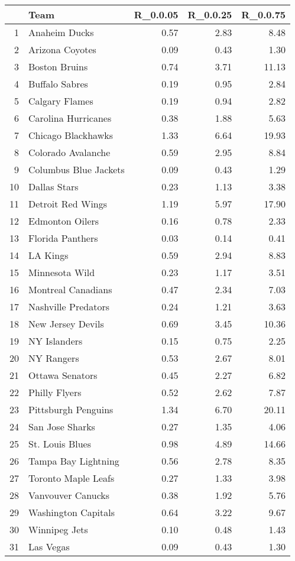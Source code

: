 \begin{table}[ht]
\centering
\begin{tabular}{rlrrr}
  \hline
 & Team & R\_0.0.05 & R\_0.0.25 & R\_0.0.75 \\ 
  \hline
1 & Anaheim Ducks & 0.57 & 2.83 & 8.48 \\ 
  2 & Arizona Coyotes & 0.09 & 0.43 & 1.30 \\ 
  3 & Boston Bruins & 0.74 & 3.71 & 11.13 \\ 
  4 & Buffalo Sabres & 0.19 & 0.95 & 2.84 \\ 
  5 & Calgary Flames & 0.19 & 0.94 & 2.82 \\ 
  6 & Carolina Hurricanes & 0.38 & 1.88 & 5.63 \\ 
  7 & Chicago Blackhawks & 1.33 & 6.64 & 19.93 \\ 
  8 & Colorado Avalanche & 0.59 & 2.95 & 8.84 \\ 
  9 & Columbus Blue Jackets & 0.09 & 0.43 & 1.29 \\ 
  10 & Dallas Stars & 0.23 & 1.13 & 3.38 \\ 
  11 & Detroit Red Wings & 1.19 & 5.97 & 17.90 \\ 
  12 & Edmonton Oilers & 0.16 & 0.78 & 2.33 \\ 
  13 & Florida Panthers & 0.03 & 0.14 & 0.41 \\ 
  14 & LA Kings & 0.59 & 2.94 & 8.83 \\ 
  15 & Minnesota Wild & 0.23 & 1.17 & 3.51 \\ 
  16 & Montreal Canadians & 0.47 & 2.34 & 7.03 \\ 
  17 & Nashville Predators & 0.24 & 1.21 & 3.63 \\ 
  18 & New Jersey Devils & 0.69 & 3.45 & 10.36 \\ 
  19 & NY Islanders & 0.15 & 0.75 & 2.25 \\ 
  20 & NY Rangers & 0.53 & 2.67 & 8.01 \\ 
  21 & Ottawa Senators & 0.45 & 2.27 & 6.82 \\ 
  22 & Philly Flyers & 0.52 & 2.62 & 7.87 \\ 
  23 & Pittsburgh Penguins & 1.34 & 6.70 & 20.11 \\ 
  24 & San Jose Sharks & 0.27 & 1.35 & 4.06 \\ 
  25 & St. Louis Blues & 0.98 & 4.89 & 14.66 \\ 
  26 & Tampa Bay Lightning & 0.56 & 2.78 & 8.35 \\ 
  27 & Toronto Maple Leafs & 0.27 & 1.33 & 3.98 \\ 
  28 & Vanvouver Canucks & 0.38 & 1.92 & 5.76 \\ 
  29 & Washington Capitals & 0.64 & 3.22 & 9.67 \\ 
  30 & Winnipeg Jets & 0.10 & 0.48 & 1.43 \\ 
  31 & Las Vegas & 0.09 & 0.43 & 1.30 \\ 
   \hline
\end{tabular}
\end{table}
